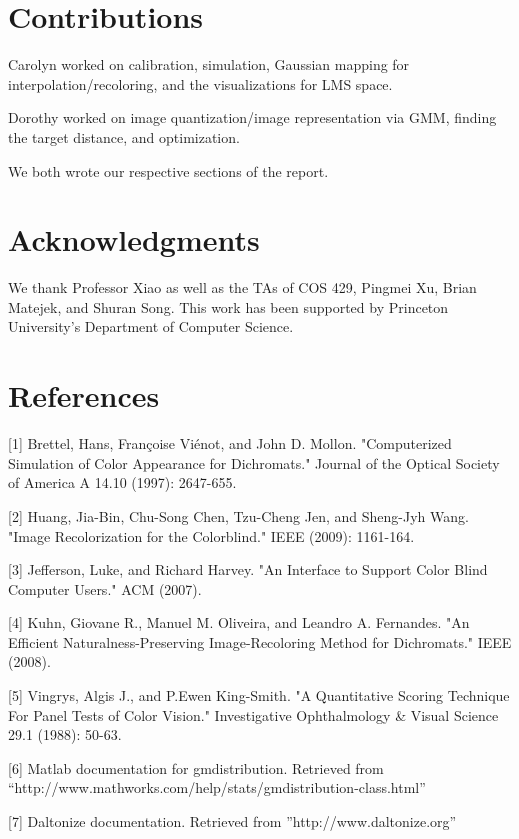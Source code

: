 \documentclass[10pt,twocolumn,letterpaper]{article}
\begin{document}
\section{Contributions}
Carolyn worked on calibration, simulation, Gaussian mapping for interpolation/recoloring, and the visualizations for LMS space. 

Dorothy worked on image quantization/image representation via GMM, finding the target distance, and optimization. 

We both wrote our respective sections of the report. 

\section{Acknowledgments}

We thank Professor Xiao as well as the TAs of COS 429, Pingmei Xu, Brian Matejek, and Shuran Song. This work has been supported by Princeton University’s Department of Computer Science. 


\section{References}

{\small


[1] Brettel, Hans, Françoise Viénot, and John D. Mollon. "Computerized Simulation of Color 
Appearance for Dichromats." Journal of the Optical Society of America A 14.10 (1997): 2647-655. 

[2] Huang, Jia-Bin, Chu-Song Chen, Tzu-Cheng Jen, and Sheng-Jyh Wang. "Image Recolorization for the Colorblind." IEEE (2009): 1161-164. 

[3] Jefferson, Luke, and Richard Harvey. "An Interface to Support Color Blind Computer Users." ACM (2007).

[4] Kuhn, Giovane R., Manuel M. Oliveira, and Leandro A. Fernandes. "An Efficient Naturalness-Preserving Image-Recoloring Method for Dichromats." IEEE (2008).

[5] Vingrys, Algis J., and P.Ewen King-Smith. "A Quantitative Scoring Technique For Panel Tests of Color Vision." Investigative Ophthalmology \& Visual Science 29.1 (1988): 50-63. 

[6] Matlab documentation for gmdistribution. Retrieved from ``http://www.mathworks.com/help/stats/gmdistribution-class.html''

[7] Daltonize documentation. Retrieved from ''http://www.daltonize.org''

}
\end{document}
